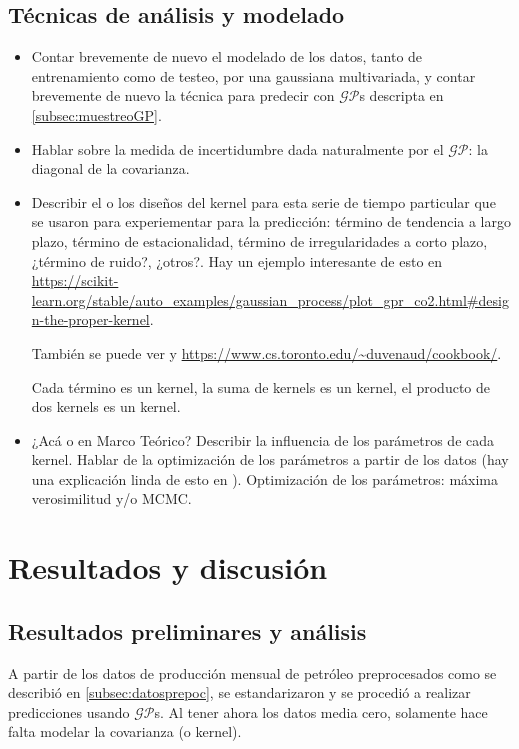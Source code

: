 \documentclass[a4paper]{article}
\newcommand{\gp}{\ensuremath{\mathcal{GP}}}
\begin{document}
\subsection{Técnicas de análisis y modelado}
\begin{itemize}
	\item Contar brevemente de nuevo el modelado de los datos, tanto de entrenamiento como de testeo, por una gaussiana multivariada, y contar brevemente de nuevo la técnica para predecir con $\gp$s descripta en \ref{subsec:muestreoGP}.
	
	\item Hablar sobre la medida de incertidumbre dada naturalmente por el $\gp$: la diagonal de la covarianza.
	
	\item Describir el o los diseños del kernel para esta serie de tiempo particular que se usaron para experiementar para la predicción: término de tendencia a largo plazo, término de estacionalidad, término de irregularidades a corto plazo, ¿término de ruido?, ¿otros?. Hay un ejemplo interesante de esto en \url{https://scikit-learn.org/stable/auto_examples/gaussian_process/plot_gpr_co2.html#design-the-proper-kernel}.
	
	También se puede ver \cite{tesisduvenaud} y \url{https://www.cs.toronto.edu/~duvenaud/cookbook/}.
	
	Cada término es un kernel, la suma de kernels es un kernel, el producto de dos kernels es un kernel.
	
	\item ¿Acá o en Marco Teórico? Describir la influencia de los parámetros de cada kernel. Hablar de la optimización de los parámetros a partir de los datos (hay una explicación linda de esto en \cite{tobar}). Optimización de los parámetros: máxima verosimilitud y/o MCMC.
\end{itemize}



\section{Resultados y discusión}

\subsection{Resultados preliminares y análisis}
A partir de los datos de producción mensual de petróleo preprocesados como se describió en \ref{subsec:datosprepoc}, se estandarizaron y se procedió a realizar predicciones usando $\gp$s. Al tener ahora los datos media cero, solamente hace falta modelar la covarianza (o kernel).
\end{document}

